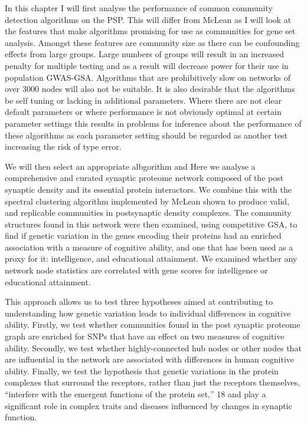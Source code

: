 In this chapter I will first analyse the performance of common community detection algorithms on the PSP. This will differ from McLean\cite{mclean2016improved} as I will look at the features that make algorithms promising for use as communities for gene set analysis. Amongst these features are community size as there can be confounding effects from large groups. \cite{de2016statistical} Large numbers of groups will result in an increased penalty for multiple testing and as a result will decrease power for their use in population GWAS-GSA. Algorithms that are prohibitively slow on networks of over 3000 nodes will also not be suitable. It is also desirable that the algorithms be self tuning or lacking in additional parameters. Where there are not clear default parameters or where performance is not obviously optimal at certain parameter settings this results in problems for inference about the performance of these algorithms as each parameter setting should be regarded as another test increasing the risk of type  error. 


We will then select an appropriate albgorithm and
Here we analyse a comprehensive and curated synaptic proteome network composed of the post synaptic density and its essential protein interactors. We combine this with the spectral clustering algorithm implemented by McLean shown to produce valid, and replicable communities in postsynaptic density complexes. \cite{mclean2016improved}  The community structures found in this network were then examined, using competitive GSA, to find if genetic variation in the genes encoding their proteins had an enriched association with a measure of cognitive ability, and one that has been used as a proxy for it: intelligence, and educational attainment. We examined whether any network node statistics are correlated with gene scores for intelligence or educational attainment.

 This approach allows us to test three hypotheses aimed at contributing to understanding how genetic variation leads to individual differences in cognitive ability. Firstly, we test whether communities found in the post synaptic proteome graph are enriched for SNPs that have an effect on two measures of cognitive ability. Secondly, we test whether highly-connected hub nodes or other nodes that are influential in the network are associated with differences in human cognitive ability. Finally, we test the hypothesis that genetic variations in the protein complexes that surround the receptors, rather than just the receptors themselves, “interfere with the emergent functions of the protein set‚” 18  and play  a significant role in complex traits and diseases influenced by changes in synaptic function. 

